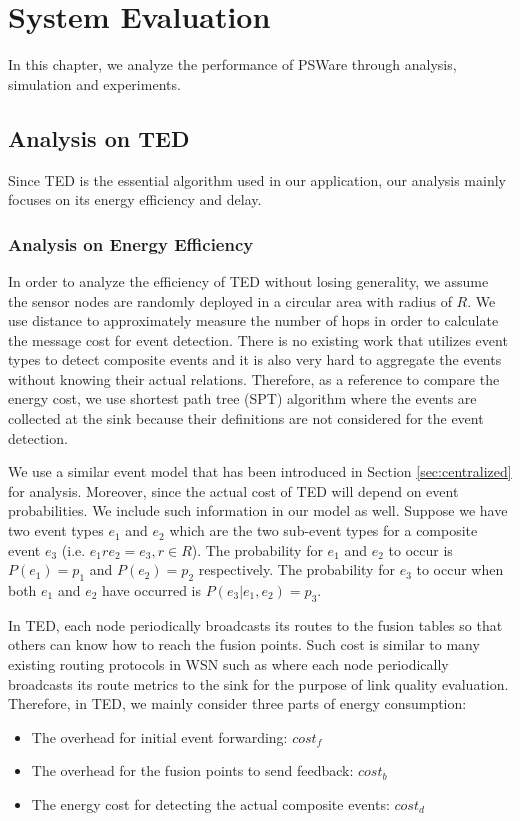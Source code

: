 \chapter{System Evaluation}
\label{chapter:evaluation}
In this chapter, we analyze the performance of PSWare through analysis, simulation and experiments.

\section{Analysis on TED}
\label{sec:ceduanalysis}
Since TED is the essential algorithm used in our application, our analysis mainly focuses on its energy efficiency and delay.

\subsection{Analysis on Energy Efficiency}
In order to analyze the efficiency of TED without losing generality, we assume the sensor nodes are randomly deployed in a circular area with radius of \(R\). We use distance to approximately measure the number of hops in order to calculate the message cost for event detection. There is no existing work that utilizes event types to detect composite events and it is also very hard to aggregate the events without knowing their actual relations. Therefore, as a reference to compare the energy cost, we use shortest path tree (SPT) algorithm where the events are collected at the sink because their definitions are not considered for the event detection.


We use a similar event model that has been introduced in Section \ref{sec:centralized} for analysis. Moreover, since the actual cost of TED will depend on event probabilities. We include such information in our model as well. Suppose we have two event types \(e_1\) and \(e_2\) which are the two sub-event types for a composite event \(e_3\) (i.e. \(e_1re_2=e_3, r\in R\)). The probability for \(e_1\) and \(e_2\) to occur is \(P(e_1)=p_1\) and \(P(e_2)=p_2\) respectively. The probability for \(e_3\) to occur when both \(e_1\) and \(e_2\) have occurred is \(P(e_3|e_1, e_2)=p_3\).

In TED, each node periodically broadcasts its routes to the fusion tables so that others can know how to reach the fusion points. Such cost is similar to many existing routing protocols in WSN such as \cite{rssiroute} where each node periodically broadcasts its route metrics to the sink for the purpose of link quality evaluation. Therefore, in TED, we mainly consider three parts of energy consumption:
\begin{itemize}
\item The overhead for initial event forwarding: \(cost_f\)
\item The overhead for the fusion points to send feedback: \(cost_b\)
\item The energy cost for detecting the actual composite events: \(cost_d\)
\end{itemize}

